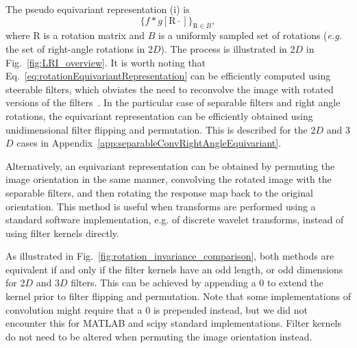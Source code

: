 \documentclass[fleqn,a4paper,oneside,openany]{book}
\begin{document}
The pseudo equivariant representation (i) is 
\begin{equation}\label{eq:rotationEquivariantRepresentation}
    \{ f\ast g[\mathrm{R}\cdot]\}_{\mathrm{R}\in B},
\end{equation}
where $\mathrm{R}$ is a rotation matrix and $B$ is a uniformly sampled set of rotations (\textit{e.g.} the set of right-angle rotations in 2$D$).
The process is illustrated in 2$D$ in Fig.~\ref{fig:LRI_overview}.
It is worth noting that Eq.~\eqref{eq:rotationEquivariantRepresentation} can be efficiently computed using steerable filters, which obviates the need to reconvolve the image with rotated versions of the filters~\cite{WHS2018,AFO2019}. 
%
In the particular case of separable filters and right angle rotations, the equivariant representation can be efficiently obtained using unidimensional filter flipping and permutation. This is described for the 2$D$ and 3$D$ cases in Appendix~\ref{app:separableConvRightAngleEquivariant}.

Alternatively, an equivariant representation can be obtained by permuting the image orientation in the same manner, convolving the rotated image with the separable filters, and then rotating the response map back to the original orientation.
This method is useful when transforms are performed using a standard software implementation, e.g. of discrete wavelet transforms, instead of using filter kernels directly.

As illustrated in Fig.~\ref{fig:rotation_invariance_comparison}, both methods are equivalent if and only if the filter kernels have an odd length, or odd dimensions for 2$D$ and 3$D$ filters. This can be achieved by appending a $0$ to extend the kernel prior to filter flipping and permutation. Note that some implementations of convolution might require that a $0$ is prepended instead, but we did not encounter this for MATLAB and scipy standard implementations. 
Filter kernels do not need to be altered when permuting the image orientation instead.
\end{document}
